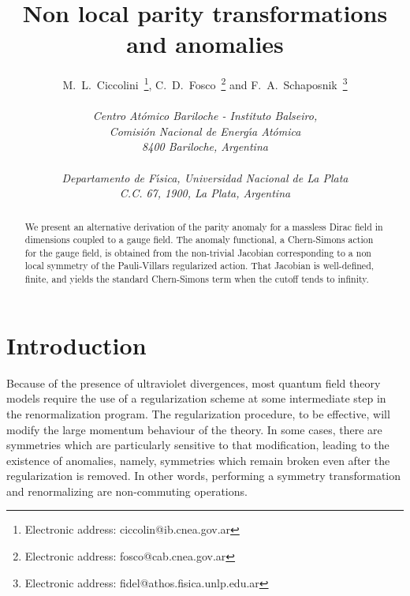 \documentclass[a4paper,12pt]{article}
\begin{document}
\title{Non local parity transformations and anomalies}
\author{M.~L.~Ciccolini\coordHE{}~\footnote{Electronic address:
    ciccolin@ib.cnea.gov.ar}, C.~D.~Fosco\coordHE{}~\footnote{Electronic
    address: fosco@cab.cnea.gov.ar} and
  F.~A.~Schaposnik\coordHE{}~\footnote{Electronic address:
    fidel@athos.fisica.unlp.edu.ar}\\ \\
{\normalsize\it {}\coordHE{}Centro At\' omico Bariloche - Instituto Balseiro,}\\ 
{\normalsize\it Comisi\'on Nacional de Energ\'{\i}a At\'omica}\\
{\normalsize\it 8400 Bariloche, Argentina}\\ \\
{\normalsize\it {}\coordHE{}Departamento de F\'\i sica, Universidad Nacional
    de La Plata}\\
  {\normalsize\it C.C. 67, 1900, La Plata, Argentina} } \date{\hfill}
\maketitle
\begin{abstract}
\noindent
We present an alternative derivation of the parity anomaly for a
massless Dirac field in \coordHE{} dimensions coupled to a gauge field. The
anomaly functional, a Chern-Simons action for the gauge field, is
obtained from the non-trivial Jacobian corresponding to a non local
symmetry of the Pauli-Villars regularized action. That Jacobian is
well-defined, finite, and yields the standard Chern-Simons term when
the cutoff tends to infinity.
\end{abstract}
\bigskip

\section{Introduction}
Because of the presence of ultraviolet divergences, most quantum field
theory models require the use of a regularization scheme at some
intermediate step in the renormalization program. The regularization
procedure, to be effective, will modify the large momentum behaviour
of the theory. In some cases, there are symmetries which are
particularly sensitive to that modification, leading to the existence
of anomalies, namely, symmetries which remain broken even after the
regularization is removed. In other words, performing a symmetry
transformation and renormalizing are non-commuting operations.
\end{document}
